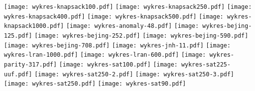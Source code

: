 \documentclass[a4paper,11pt]{article}
\begin{document}
\noindent
\texttt{[image: wykres-knapsack100.pdf]}
\texttt{[image: wykres-knapsack250.pdf]}
\texttt{[image: wykres-knapsack400.pdf]}
\texttt{[image: wykres-knapsack500.pdf]}
\texttt{[image: wykres-knapsack1000.pdf]}
\texttt{[image: wykres-anomaly-48.pdf]}
\texttt{[image: wykres-bejing-125.pdf]}
\texttt{[image: wykres-bejing-252.pdf]}
\texttt{[image: wykres-bejing-590.pdf]}
\texttt{[image: wykres-bejing-708.pdf]}
\texttt{[image: wykres-jnh-11.pdf]}
\texttt{[image: wykres-lran-1000.pdf]}
\texttt{[image: wykres-lran-600.pdf]}
\texttt{[image: wykres-parity-317.pdf]}
\texttt{[image: wykres-sat100.pdf]}
\texttt{[image: wykres-sat225-uuf.pdf]}
\texttt{[image: wykres-sat250-2.pdf]}
\texttt{[image: wykres-sat250-3.pdf]}
\texttt{[image: wykres-sat250.pdf]}
\texttt{[image: wykres-sat90.pdf]}
\end{document}
